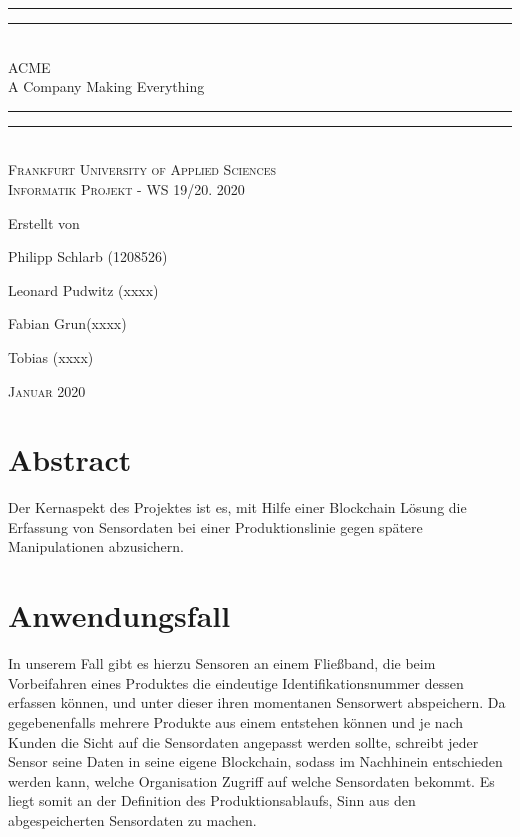 \documentclass[12pt]{report}
\newlength{\drop}
\begin{document}
\begin{titlepage}
    \textheight
    \centering
    \vspace*{\baselineskip}
    \rule{\textwidth}{1.6pt}\vspace*{-\baselineskip}\vspace*{2pt}
    \rule{\textwidth}{0.4pt}\\[\baselineskip]
    {\LARGE ACME \\ [0.3\baselineskip]A Company Making Everything}\\[0.2\baselineskip]
    \rule{\textwidth}{0.4pt}\vspace*{-\baselineskip}\vspace{3.2pt}
    \rule{\textwidth}{1.6pt}\\[\baselineskip]
    \scshape
    Frankfurt University of Applied Sciences \\Informatik Projekt - WS 19/20. 2020
    \date{4 February 2019} \par
    \vspace*{2\baselineskip}
    Erstellt von \\[\baselineskip]
    {\Large Philipp Schlarb (1208526) \par}
    {\Large Leonard Pudwitz (xxxx) \par}
    {\Large Fabian Grun(xxxx) \par}
    {\Large Tobias  (xxxx) \par}
    \vfill
    
    \vfill{}
    {\scshape Januar 2020} \\
\end{titlepage}
\tableofcontents

\newpage

\chapter{Abstract}
Der Kernaspekt des Projektes ist es, mit Hilfe einer Blockchain Lösung die Erfassung von Sensordaten bei einer Produktionslinie gegen spätere Manipulationen abzusichern. 

\chapter{Anwendungsfall}
In unserem Fall gibt es hierzu Sensoren an einem Fließband, die beim Vorbeifahren eines Produktes die eindeutige Identifikationsnummer dessen erfassen können, und unter dieser ihren momentanen Sensorwert abspeichern.
Da gegebenenfalls mehrere Produkte aus einem entstehen können und je nach Kunden die Sicht auf die Sensordaten angepasst werden sollte, schreibt jeder Sensor seine Daten in seine eigene Blockchain, sodass im Nachhinein entschieden werden kann, welche Organisation Zugriff auf welche Sensordaten bekommt. Es liegt somit an der Definition des Produktionsablaufs, Sinn aus den abgespeicherten Sensordaten zu machen.
\end{document}

